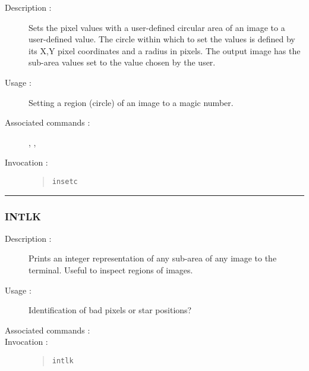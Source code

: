 \begin{description}

\item[Description :] Sets the pixel values with a user-defined circular
area of an image to a user-defined value.  The circle within which to
set the values is defined by its X,Y pixel coordinates and a radius in
pixels. The output image has the sub-area values set to the value
chosen by the user.

\item[Usage :] Setting a region (circle) of an image to a magic number.

\item[Associated commands :] {\tt {}}, 
{\tt {}}, {\tt {}}

\item[Invocation :]

\begin{quote}{\tt  insetc }\end{quote}

\end{description}

\hrule 
\subsubsection*{\label{INTLK}INTLK}

\begin{description}

\item[Description :] Prints an integer representation of any sub-area
of any image to the terminal.  Useful to inspect regions of images.

\item[Usage :] Identification of bad pixels or star positions?
\item[Associated commands :] {\tt {}}
\item[Invocation :]

\begin{quote}{\tt  intlk }\end{quote}

\end{description}

% 
% 
% 
%
%
%


